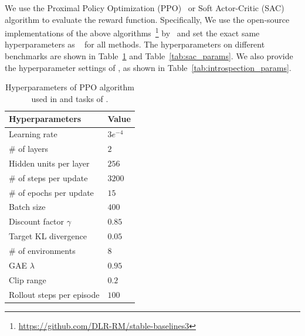 \documentclass{article}
\theoremstyle{plain}
\theoremstyle{definition}
\theoremstyle{remark}
\begin{document}
We use the Proximal Policy Optimization (PPO)~\cite{schulman2017proximal} or Soft Actor-Critic (SAC)~\cite{haarnoja2018soft} algorithm to evaluate the reward function. Specifically, We use the open-source implementations of the above algorithms~\footnote{\url{https://github.com/DLR-RM/stable-baselines3}} by~\cite{raffin2021stable} and set the exact same hyperparameters as ~\cite{Text2Reward} for all methods. The hyperparameters on different benchmarks are shown in Table~\ref{tab:ppo_params} and Table~\ref{tab:sac_params}. We also provide the hyperparameter settings of \ourmethod, as shown in Table~\ref{tab:introspection_params}.


\begin{table}[!ht]
\centering
\caption{Hyperparameters of PPO algorithm used in \textit{\LiftCube} and \textit{\PickCube} tasks of \MS.}
\begin{tabular}{ll}
\toprule
    \textbf{Hyperparameters} & \textbf{Value} \\
\midrule
    Learning rate & $3e^{-4}$ \\
    \# of layers & $2$ \\
    Hidden units per layer & $256$ \\
    \# of steps per update & $3200$ \\
    \# of epochs per update & $15$ \\
    Batch size & $400$ \\
    Discount factor $\gamma$ & $0.85$ \\
    Target KL divergence & $0.05$ \\
    \# of environments & $8$ \\
    GAE $\lambda$ & $0.95$ \\
    Clip range & $0.2$ \\
    Rollout steps per episode & $100$ \\
\bottomrule
\end{tabular}
\label{tab:ppo_params}
\end{table}
\end{document}
